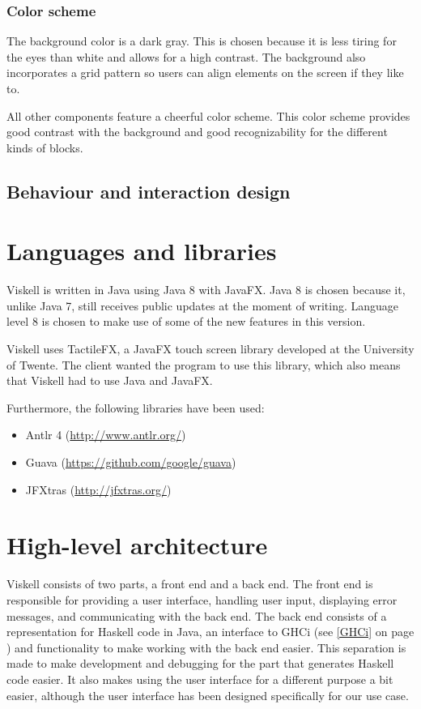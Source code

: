 \subsubsection{Color scheme}

The background color is a dark gray.
This is chosen because it is less tiring for the eyes than white and allows for a high contrast.
The background also incorporates a grid pattern so users can align elements on the screen if they like to.

All other components feature a cheerful color scheme.
This color scheme provides good contrast with the background and good recognizability for the different kinds of blocks.

\subsection{Behaviour and interaction design}

\section{Languages and libraries}
Viskell is written in Java using Java 8 with JavaFX. 
Java 8 is chosen because it, unlike Java 7, still receives public updates at the moment of writing.
Language level 8 is chosen to make use of some of the new features in this version.

Viskell uses TactileFX, a JavaFX touch screen library developed at the University of Twente.
The client wanted the program to use this library, which also means that Viskell had to use Java and JavaFX.

Furthermore, the following libraries have been used:

\begin{itemize}
	\item Antlr 4 (\url{http://www.antlr.org/})
	\item Guava (\url{https://github.com/google/guava})
	\item JFXtras (\url{http://jfxtras.org/})
\end{itemize}

\section{High-level architecture}
Viskell consists of two parts, a front end and a back end.  
The front end is responsible for providing a user interface, handling user input, displaying error messages, and communicating with the back end.
The back end consists of a representation for Haskell code in Java, an interface to GHCi (see \ref{GHCi} on page \pageref{GHCi}) and functionality to make working with the back end easier.
This separation is made to make development and debugging for the part that generates Haskell code easier.
It also makes using the user interface for a different purpose a bit easier, although the user interface has been designed specifically for our use case.

